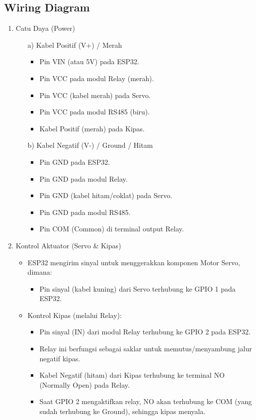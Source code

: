 \documentclass[a4paper, 12pt]{article}
\begin{document}
\subsection{Wiring Diagram}
\begin{enumerate}
    \item Catu Daya (Power)
    \begin{itemize}
        \item[a)] Kabel Positif (V+) / Merah
        \begin{itemize}
            \item Pin VIN (atau 5V) pada ESP32.
            \item Pin VCC pada modul Relay (merah).
            \item Pin VCC (kabel merah) pada Servo.
            \item Pin VCC pada modul RS485 (biru).
            \item Kabel Positif (merah) pada Kipas.
        \end{itemize}
        \item[b)] Kabel Negatif (V-) / Ground / Hitam
        \begin{itemize}
            \item Pin GND pada ESP32.
            \item Pin GND pada modul Relay.
            \item Pin GND (kabel hitam/coklat) pada Servo.
            \item Pin GND pada modul RS485.
            \item Pin COM (Common) di terminal output Relay.
        \end{itemize}
    \end{itemize}
    
    \item Kontrol Aktuator (Servo \& Kipas)
    \begin{itemize}
        \item ESP32 mengirim sinyal untuk menggerakkan komponen Motor Servo, dimana:
        \begin{itemize}
            \item Pin sinyal (kabel kuning) dari Servo terhubung ke GPIO 1 pada ESP32.
        \end{itemize}
        \item Kontrol Kipas (melalui Relay):
        \begin{itemize}
            \item Pin sinyal (IN) dari modul Relay terhubung ke GPIO 2 pada ESP32.
            \item Relay ini berfungsi sebagai saklar untuk memutus/menyambung jalur negatif kipas.
            \item Kabel Negatif (hitam) dari Kipas terhubung ke terminal NO (Normally Open) pada Relay.
            \item Saat GPIO 2 mengaktifkan relay, NO akan terhubung ke COM (yang sudah terhubung ke Ground), sehingga kipas menyala.
        \end{itemize}
    \end{itemize}
    

\end{enumerate}
\end{document}
